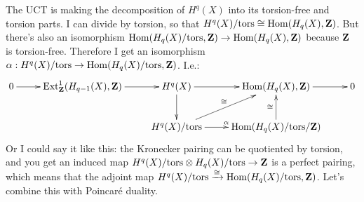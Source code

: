 The UCT is making the decomposition of $H^q(X)$ into its torsion-free and torsion parts. I can divide by torsion, so that $H^q(X)/\mathrm{tors}\cong \operatorname{Hom}(H_q(X),\mathbf Z)$. But there's also an isomorphism $\operatorname{Hom}(H_q(X)/\mathrm{tors},\mathbf Z)\to \operatorname{Hom}(H_q(X),\mathbf Z)$ because $\mathbf Z$ is torsion-free. Therefore I get an isomorphism $\alpha:H^q(X)/\mathrm{tors}\to \operatorname{Hom}(H_q(X)/\mathrm{tors},\mathbf Z)$. I.e.:
\begin{equation*}
\xymatrix{
	0\ar[r] & \Ext^1_\Z(H_{q-1}(X),\Z)\ar[r] & H^{q}(X)\ar[r]\ar[d] & \Hom(H_q(X),\Z)\ar[r] & 0\\
 & & H^q(X)/\mathrm{tors}\ar[ur]^{\cong}\ar[r]^{\alpha} & \Hom(H_q(X)/\mathrm{tors}/\Z)\ar[u]^{\cong}
}
\end{equation*}
Or I could say it like this: the Kronecker pairing can be quotiented by torsion, and you get an induced map $H^q(X)/\mathrm{tors}\otimes H_q(X)/\mathrm{tors}\to\mathbf Z$ is a perfect pairing, which means that the adjoint map $H^q(X)/\mathrm{tors}\xrightarrow{\cong}\operatorname{Hom}(H_q(X)/\mathrm{tors},\mathbf Z)$. Let's combine this with Poincar\'e duality.

